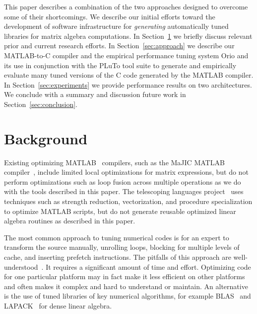 \documentclass[runningheads]{llncs}
\begin{document}
This paper describes a combination of the two approaches designed to overcome
some of their shortcomings. We describe our initial efforts toward the
development of software infrastructure for \emph{generating} automatically
tuned libraries for matrix algebra computations.  In
Section~\ref{sec:background} we briefly discuss relevant prior and current
research efforts. In Section~\ref{sec:approach} we describe our
MATLAB-to-C compiler and the empirical performance
tuning system Orio and its use in conjunction with the PLuTo tool suite to
generate and empirically evaluate many tuned versions of the C code generated
by the MATLAB compiler.  In Section~\ref{sec:experiments} we provide
performance results on two architectures. We conclude with a summary and
discussion future work in Section~\ref{sec:conclusion}.


\section{Background}
\label{sec:background}

Existing optimizing MATLAB~\cite{matlab:webpage} compilers, such as the MaJIC
MATLAB compiler~\cite{MaJIC}, include limited local optimizations for matrix
expressions, but do not perform optimizations such as loop fusion across
multiple operations as we do with the tools described in this paper. The
telescoping languages
project~\cite{telescopingurl} uses techniques such as
strength reduction, vectorization, and procedure specialization to optimize
MATLAB scripts, but do not generate reusable optimized linear algebra
routines as described in this paper.

The most common approach to tuning numerical codes is for an expert to
transform the source manually, unrolling loops, blocking for multiple levels
of cache, and inserting prefetch instructions.  The pitfalls of this approach
are well-understood~\cite{Goedecker01}.  It requires a significant amount of
time and effort. Optimizing code for one particular platform may in fact make
it less efficient on other platforms and often makes it complex and hard to
understand or maintain.  An alternative is the use of tuned libraries of key
numerical algorithms, for example BLAS~\cite{Dongarra:1990fk} and
LAPACK~\cite{LAPACK} for dense linear algebra.
\end{document}
